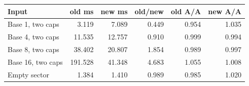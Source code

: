 \begin{center}
\small
\begin{tabular}{lrrrrr}
\toprule
Input & old ms & new ms & old/new & old A/A & new A/A\\
\midrule
Base 1, two caps & 3.119 & 7.089 & 0.449 & 0.954 & 1.035\\
Base 4, two caps & 11.535 & 12.757 & 0.910 & 0.999 & 0.994\\
Base 8, two caps & 38.402 & 20.807 & 1.854 & 0.989 & 0.997\\
Base 16, two caps & 191.528 & 41.348 & 4.683 & 1.055 & 1.008\\
Empty sector & 1.384 & 1.410 & 0.989 & 0.985 & 1.020\\
\bottomrule
\end{tabular}
\end{center}
